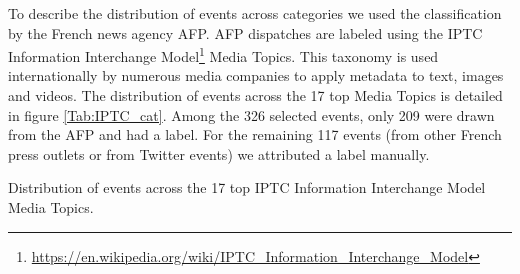 To describe the distribution of events across categories we used the classification by the French news agency AFP. AFP dispatches are labeled using the IPTC Information Interchange Model\footnote{\url{https://en.wikipedia.org/wiki/IPTC_Information_Interchange_Model}} Media Topics. This taxonomy is used internationally by numerous media companies to apply metadata to text, images and videos. The distribution of events across the 17 top Media Topics is detailed in figure \ref{Tab:IPTC_cat}. Among the 326 selected events, only 209 were drawn from the AFP and had a label. For the remaining 117 events (from other French press outlets or from Twitter events) we attributed a label manually.

\begin{table}
\begin{center}
\makebox[\textwidth][c]{}
\end{center}
\caption{Distribution of events across the 17 top IPTC Information Interchange Model Media Topics. \label{Tab:IPTC_cat}}
\end{table}


